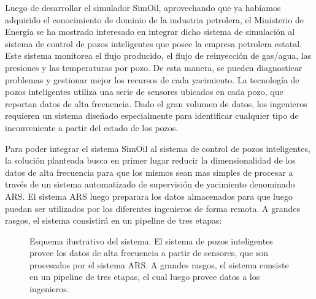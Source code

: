 \documentclass{article}
\theoremstyle{definition}
\theoremstyle{remark}
\begin{document}
Luego de desarrollar el simulador SimOil, aprovechando que ya habíamos adquirido el conocimiento de dominio de la industria petrolera, el Ministerio de Energía se ha mostrado interesado en integrar dicho sistema de simulación al sistema de control de pozos inteligentes que posee la empresa petrolera estatal. Este sistema monitorea el flujo producido, el flujo de reinyección de gas/agua, las presiones y las temperaturas por pozo. De esta manera, se pueden diagnosticar problemas y gestionar mejor los recursos de cada yacimiento. La tecnología de pozos inteligentes utiliza una serie de sensores ubicados en cada pozo, que reportan datos de alta frecuencia. Dado el gran volumen de datos, los ingenieros requieren un sistema diseñado especialmente para identificar cualquier tipo de inconveniente a partir del estado de los pozos.

Para poder integrar el sistema SimOil al sistema de control de pozos inteligentes, la solución planteada busca en primer lugar reducir la dimensionalidad de los datos de alta frecuencia para que los mismos sean mas simples de procesar a través de un sistema automatizado de supervisión de yacimiento denominado ARS. El sistema ARS luego preparara los datos almacenados para que luego puedan ser utilizados por los diferentes ingenieros de forma remota. A grandes rasgos, el sistema consistirá en un pipeline de tres etapas:

\begin{figure}[H]
  \caption{Esquema ilustrativo del sistema. El sistema de pozos inteligentes provee los datos de alta frecuencia a partir de sensores, que son procesados por el sistema ARS. A grandes rasgos, el sistema consiste en un pipeline de tres etapas, el cual luego provee datos a los ingenieros.}
\end{figure}
\end{document}
